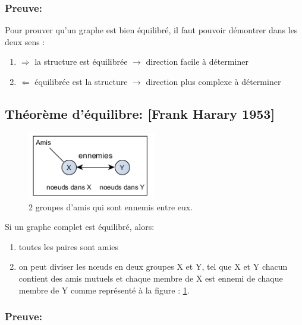 \subsubsection*{Preuve:}
Pour prouver qu'un graphe est bien équilibré, il faut pouvoir démontrer dans les deux sens :
\begin{enumerate}

\item $\Rightarrow$ la structure est équilibrée 
$\rightarrow$ direction facile à déterminer
\item $\Leftarrow$ équilibrée est la structure 
$\rightarrow$ direction plus complexe à déterminer

\end{enumerate}

\subsection{Théorème d'équilibre: [Frank Harary 1953]}
\begin{figure}[h!]
\label{groupami}
\caption{2 groupes d'amis qui sont ennemis entre eux.}
\centering
\includegraphics[width=0.5\textwidth]{images/22_amis-ennemies2.png}
\end{figure}

Si un graphe complet est équilibré, alors:

\begin{enumerate}

\item toutes les paires sont amies

\item on peut diviser les nœuds en deux groupes X et Y, tel que X et Y chacun contient des amis mutuels et chaque membre de X est ennemi de chaque membre de Y comme représenté à la figure : \ref{groupami}.

\end{enumerate}

\subsubsection*{Preuve:}

